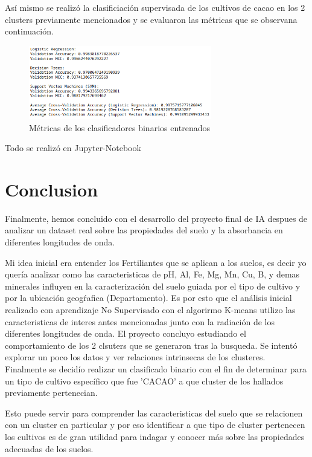 \documentclass[journal,transmag]{IEEEtran}
\begin{document}
Así mismo se realizó la clasificiación supervisada de los cultivos de cacao en los 2 clusters previamente mencionados y se evaluaron las métricas que se observana continuación.

\begin{figure}[!h]
    \center
    \includegraphics[width=8cm]{imgs/s2.png}
    \caption{Métricas de los clasificadores binarios entrenados}
    \label{1}
\end{figure}

Todo se realizó en Jupyter-Notebook



\section{Conclusion}
Finalmente, hemos concluido con el desarrollo del proyecto final de IA despues de analizar un dataset real sobre las propiedades del suelo y la absorbancia en diferentes longitudes de onda.

Mi idea inicial era entender los Fertiliantes que se aplican a los suelos, es decir yo quería analizar como las caracteristicas de pH, Al, Fe, Mg, Mn, Cu, B, y demas minerales influyen en la caracterización del suelo guiada por el tipo de cultivo y por la ubicación geogŕafica (Departamento). Es por esto que el análisis inicial realizado con aprendizaje No Supervisado con el algorirmo K-means utilizo las caracteristicas de interes antes mencionadas junto con la radiación de los diferentes longitudes de onda. El proyecto concluyo estudiando el comportamiento de los 2 clsuters que se generaron tras la busqueda. Se intentó explorar un poco los datos y ver relaciones intrinsecas de los clusteres. Finalmente se decidío realizar un clasificado binario con el fin de determinar para un tipo de cultivo específico que fue 'CACAO' a que cluster de los hallados previamente pertenecian.

Esto puede servir para comprender las caracteristicas del suelo que se relacionen con un cluster en particular y por eso identificar a que tipo de cluster pertenecen los cultivos es de gran utilidad para indagar y conocer más sobre las propiedades adecuadas de los suelos.



\appendices




\ifCLASSOPTIONcaptionsoff
  \newpage
\fi
\end{document}
